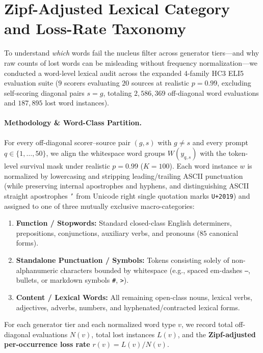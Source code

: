 \documentclass[11pt]{article}
\begin{document}
\section{Zipf-Adjusted Lexical Category and Loss-Rate Taxonomy}
\label{app:zipf}

To understand \emph{which} words fail the nucleus filter across generator tiers—and why raw counts of lost words can be misleading without frequency normalization—we conducted a word-level lexical audit across the expanded 4-family HC3 ELI5 evaluation suite ($9$ scorers evaluating $20$ sources at realistic $p=0.99$, excluding self-scoring diagonal pairs $s = g$, totaling $2{,}586{,}369$ off-diagonal word evaluations and $187{,}895$ lost word instances).

\paragraph{Methodology \& Word-Class Partition.}
For every off-diagonal scorer--source pair $(g, s)$ with $g \neq s$ and every prompt $q \in \{1, \dots, 50\}$, we align the whitespace word groups $W(y_{q,s})$ with the token-level survival mask under realistic $p=0.99$ ($K=100$). Each word instance $w$ is normalized by lowercasing and stripping leading/trailing ASCII punctuation (while preserving internal apostrophes and hyphens, and distinguishing ASCII straight apostrophes \texttt{'} from Unicode right single quotation marks \texttt{U+2019}) and assigned to one of three mutually exclusive macro-categories:
\begin{enumerate}
    \item \textbf{Function / Stopwords:} Standard closed-class English determiners, prepositions, conjunctions, auxiliary verbs, and pronouns ($85$ canonical forms).
    \item \textbf{Standalone Punctuation / Symbols:} Tokens consisting solely of non-alphanumeric characters bounded by whitespace (e.g., spaced em-dashes \texttt{---}, bullets, or markdown symbols \texttt{\#}, \texttt{>}).
    \item \textbf{Content / Lexical Words:} All remaining open-class nouns, lexical verbs, adjectives, adverbs, numbers, and hyphenated/contracted lexical forms.
\end{enumerate}
For each generator tier and each normalized word type $v$, we record total off-diagonal evaluations $N(v)$, total lost instances $L(v)$, and the \textbf{Zipf-adjusted per-occurrence loss rate} $r(v) = L(v)/N(v)$.
\end{document}

